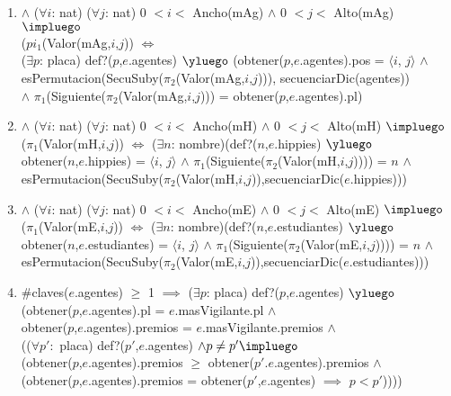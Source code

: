 \begin{Representacion}
{\begin{enumerate}
		$\land$ Ancho(mE) = Ancho(mH) $\land$ Alto(mE) = Alto(mH)
		\item $\land$ ($\forall i$: nat) ($\forall j$: nat) 0 $< i <$ Ancho(mAg) $\land$ 0 $< j <$ Alto(mAg) $\impluego$ \\
		($pi_1$(Valor(mAg,$i$,$j$)) $\iff$ \\
		($\exists p$: placa) def?($p$,$e$.agentes) $\yluego$ (obtener($p$,$e$.agentes).pos = $\langle i$, $j \rangle$ $\land$ \\ 
		esPermutacion(SecuSuby($\pi_2$(Valor(mAg,$i$,$j$))), secuenciarDic(agentes)) \\
		$\land$ $\pi_1$(Siguiente($\pi_2$(Valor(mAg,$i$,$j$))) = obtener($p$,$e$.agentes).pl)
		\item $\land$ ($\forall i$: nat) ($\forall j$: nat) 0 $< i <$ Ancho(mH) $\land$ 0 $< j <$ Alto(mH) $\impluego$ \\
		($\pi_1$(Valor(mH,$i$,$j$)) $\iff$ ($\exists n$: nombre)(def?($n$,$e$.hippies) $\yluego$ \\
		obtener($n$,$e$.hippies) = $\langle i$, $j \rangle$ $\land$ $\pi_1$(Siguiente($\pi_2$(Valor(mH,$i$,$j$)))) = $n$ $\land$ \\
		esPermutacion(SecuSuby($\pi_2$(Valor(mH,$i$,$j$)),secuenciarDic($e$.hippies)))
		\item $\land$ ($\forall i$: nat) ($\forall j$: nat) 0 $< i <$ Ancho(mE) $\land$ 0 $< j <$ Alto(mE) $\impluego$ \\
		($\pi_1$(Valor(mE,$i$,$j$)) $\iff$ ($\exists n$: nombre)(def?($n$,$e$.estudiantes) $\yluego$ \\
		obtener($n$,$e$.estudiantes) = $\langle i$, $j \rangle$ $\land$ $\pi_1$(Siguiente($\pi_2$(Valor(mE,$i$,$j$)))) = $n$ $\land$ \\
		esPermutacion(SecuSuby($\pi_2$(Valor(mE,$i$,$j$)),secuenciarDic($e$.estudiantes)))
		\item $\#$claves($e$.agentes) $\geq$ 1 $\implies$ ($\exists p$: placa) def?($p$,$e$.agentes) $\yluego$ \\
		(obtener($p$,$e$.agentes).pl = $e$.masVigilante.pl $\land$ \\
		obtener($p$,$e$.agentes).premios = $e$.masVigilante.premios $\land$ \\
		(($\forall p':$ placa) def?($p'$,$e$.agentes) $\land p \neq p' \impluego$\\
		(obtener($p$,$e$.agentes).premios $\geq$ obtener($p'$.$e$.agentes).premios $\land$ \\
		(obtener($p$,$e$.agentes).premios = obtener($p'$,$e$.agentes) $\implies$ $p < p'$))))


\end{enumerate}}
\end{Representacion}
